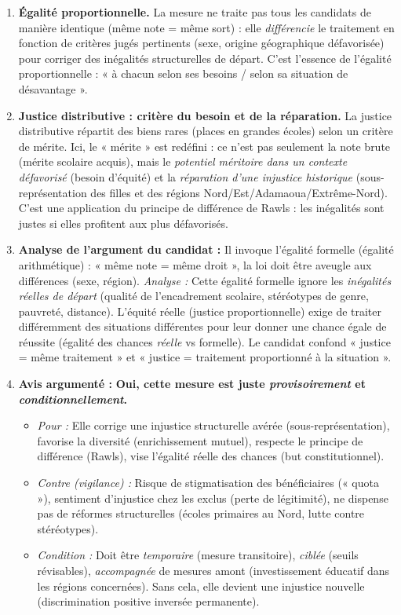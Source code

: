 \documentclass[11pt]{article}
\newcommand{\cle}[1]{{\popxbold\color{popdark}#1}}
\begin{document}
\begin{corrige}
\begin{enumerate}
\item \textbf{Égalité proportionnelle.} La mesure ne traite pas tous les candidats de manière identique (même note = même sort) : elle \emph{différencie} le traitement en fonction de critères jugés pertinents (sexe, origine géographique défavorisée) pour corriger des inégalités structurelles de départ. C'est l'essence de l'égalité proportionnelle : « à chacun selon ses besoins / selon sa situation de désavantage ».
\item \textbf{Justice distributive : critère du \cle{besoin} et de la \cle{réparation}.} La justice distributive répartit des biens rares (places en grandes écoles) selon un critère de mérite. Ici, le « mérite » est redéfini : ce n'est pas seulement la note brute (mérite scolaire acquis), mais le \emph{potentiel méritoire dans un contexte défavorisé} (besoin d'équité) et la \emph{réparation d'une injustice historique} (sous-représentation des filles et des régions Nord/Est/Adamaoua/Extrême-Nord). C'est une application du principe de \cle{différence} de Rawls : les inégalités sont justes si elles profitent aux plus défavorisés.
\item \textbf{Analyse de l'argument du candidat :} Il invoque l'\cle{égalité formelle} (égalité arithmétique) : « même note = même droit », la loi doit être aveugle aux différences (sexe, région). \emph{Analyse :} Cette égalité formelle ignore les \emph{inégalités réelles de départ} (qualité de l'encadrement scolaire, stéréotypes de genre, pauvreté, distance). L'\cle{équité réelle} (justice proportionnelle) exige de traiter différemment des situations différentes pour leur donner une chance égale de réussite (égalité des chances \emph{réelle} vs formelle). Le candidat confond « justice = même traitement » et « justice = traitement proportionné à la situation ».
\item \textbf{Avis argumenté :} \textbf{Oui, cette mesure est juste \emph{provisoirement} et \emph{conditionnellement}.}
      \begin{itemize}
      \item \emph{Pour :} Elle corrige une injustice structurelle avérée (sous-représentation), favorise la diversité (enrichissement mutuel), respecte le principe de différence (Rawls), vise l'égalité réelle des chances (but constitutionnel).
      \item \emph{Contre (vigilance) :} Risque de stigmatisation des bénéficiaires (« quota »), sentiment d'injustice chez les exclus (perte de légitimité), ne dispense pas de réformes structurelles (écoles primaires au Nord, lutte contre stéréotypes).
      \item \emph{Condition :} Doit être \emph{temporaire} (mesure transitoire), \emph{ciblée} (seuils révisables), \emph{accompagnée} de mesures amont (investissement éducatif dans les régions concernées). Sans cela, elle devient une injustice nouvelle (discrimination positive inversée permanente).
      \end{itemize}
\end{enumerate}
\end{corrige}
\end{document}
